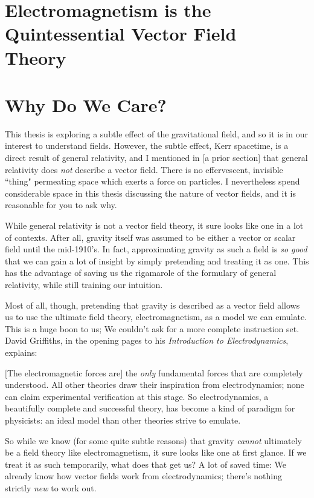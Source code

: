 \documentclass[11pt]{article}
\begin{document}
\section{Electromagnetism is the Quintessential Vector Field\\Theory}



\section{Why Do We Care?}
This thesis is exploring a subtle effect of the gravitational field, and so it is in our interest to understand fields.  However, the subtle effect, Kerr spacetime, is a direct result of general relativity, and I mentioned in [a prior section] that general relativity does \emph{not} describe a vector field.  There is no effervescent, invisible ``thing" permeating space which exerts a force on particles.  I nevertheless spend considerable space in this thesis discussing the nature of vector fields, and it is reasonable for you to ask why.

While general relativity is not a vector field theory, it sure looks like one in a lot of contexts.  After all, gravity itself was assumed to be either a vector or scalar field until the mid-1910's.  In fact, approximating gravity as such a field is \emph{so good} that we can gain a lot of insight by simply pretending and treating it as one.  This has the advantage of saving us the rigamarole of the formulary of general relativity, while still training our intuition.

Most of all, though, pretending that gravity is described as a vector field allows us to use the ultimate field theory, electromagnetism, as a model we can emulate.  This is a huge boon to us; We couldn't ask for a more complete instruction set.  David Griffiths, in the opening pages to his \emph{Introduction to Electrodynamics}, explains:
  
\begin{displayquote}
$[$The electromagnetic forces are$]$ the \emph{only} fundamental forces that are completely understood.  All other theories draw their inspiration from electrodynamics; none can claim experimental verification at this stage.  So electrodynamics, a beautifully complete and successful theory, has become a kind of paradigm for physicists: an ideal model than other theories strive to emulate.
\end{displayquote}

So while we know (for some quite subtle reasons) that gravity \emph{cannot} ultimately be a field theory like electromagnetism, it sure looks like one at first glance.  If we treat it as such temporarily, what does that get us?  A lot of saved time:  We already know how vector fields work from electrodynamics; there's nothing strictly \emph{new} to work out.
\end{document}

